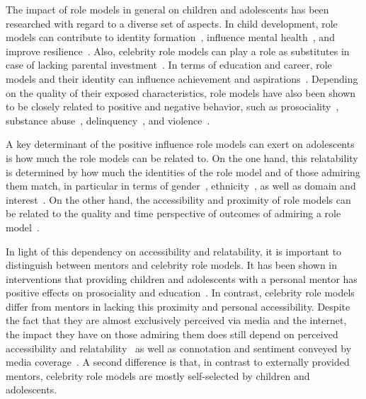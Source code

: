 The impact of role models in general on children and adolescents has been researched with regard to a diverse set of aspects. In child development, role models can contribute to identity formation~\autocite{vecci_behavioural_2019}, influence mental health~\autocite{bird_impact_2012}, and improve resilience~\autocite{werner_resilience_1995}. Also, celebrity role models can play a role as substitutes in case of lacking parental investment~\autocite{cheung_idol_2012}. In terms of education and career, role models and their identity can influence achievement and aspirations~\autocite{zirkel_is_2002, herrmann_effects_2016,christiansen_television_1979}. Depending on the quality of their exposed characteristics, role models have also been shown to be closely related to positive and negative behavior, such as prosociality~\autocite{kosse_formation_2020}, substance abuse~\autocite{yancey_role_2002, hurd_negative_2009}, delinquency~\autocite{walters_someone_2016}, and violence~\autocite{hurd_role_2011}.

A key determinant of the positive influence role models can exert on adolescents is how much the role models can be related to. On the one hand, this relatability is determined by how much the identities of the role model and of those admiring them match, in particular in terms of gender~\autocite{marx_female_2002, herrmann_effects_2016,lockwood_someone_2006}, ethnicity~\autocite{marx_obama_2009}, as well as domain and interest~\autocite{lockwood_superstars_1997}. On the other hand, the accessibility and proximity of role models can be related to the quality and time perspective of outcomes of admiring a role model~\autocite{strasser-burke_who_2020, bird_impact_2012}.

In light of this dependency on accessibility and relatability, it is important to distinguish between mentors and celebrity role models. It has been shown in interventions that providing children and adolescents with a personal mentor has positive effects on prosociality and education~\autocite{kosse_formation_2020, falk_mentoring_2020, dubois_natural_2005,rhodes_agents_2002,heckman_understanding_2013}. In contrast, celebrity role models differ from mentors in lacking this proximity and personal accessibility. Despite the fact that they are almost exclusively perceived via media and the internet, the impact they have on those admiring them does still depend on perceived accessibility and relatability~\autocite{strasser-burke_who_2020, lockwood_superstars_1997} as well as connotation and sentiment conveyed by media coverage~\autocite{lines_villains_2001, adamson_female_2019}. A second difference is that, in contrast to externally provided mentors, celebrity role models are mostly self-selected by children and adolescents.

